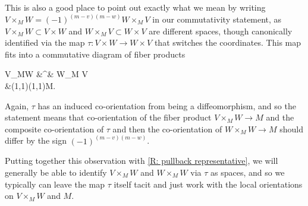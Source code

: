 \begin{remark}\label{R: precise commutativity}
	This is also a good place to point out exactly what we mean by writing $V\times_M W=(-1)^{(m-v)(m-w)}W\times_M V$ in our commutativity statement, as $V\times_MW\subset V\times W$ and $W\times_M V\subset W\times V$ are different spaces, though canonically identified via the map $\tau:V\times W\to W\times V$ that switches the coordinates.
	This map fits into a commutative diagram of fiber products
	\begin{diagram}[LaTeXeqno]
		V\times_MW &\rTo^\tau& W\times_M V\\
		&\rdTo(1,1)\ldTo(1,1)M.
	\end{diagram}
	Again, $\tau$ has an induced co-orientation from being a diffeomorphism, and so the statement means that co-orientation of the fiber product $V\times_MW\to M$ and the composite co-orientation of $\tau$ and then the co-orientation of $W\times_MW\to M$ should differ by the sign $(-1)^{(m-v)(m-w)}$.

	Putting together this observation with \cref{R: pullback representative}, we will generally be able to identify $V\times_MW$ and $W\times_M W$ via $\tau$ as spaces, and so we typically can leave the map $\tau$ itself tacit and just work with the local orientations on $V\times_MW$ and $M$.
\end{remark}

